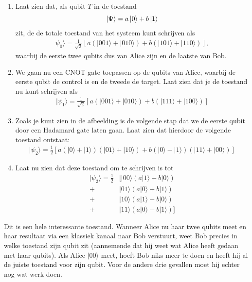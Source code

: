 \documentclass[../../main.tex]{subfiles}
\begin{document}
\clearpage
\begin{antwoord}
\end{antwoord}
\begin{opdracht}
\begin{enumerate}
\item Laat zien dat, als qubit $T$ in de toestand 
\[\ket{\Psi}=a\ket{0}+b\ket{1}\] 
zit, de de totale toestand van het systeem kunt schrijven als
\begin{align*}
\psi_0\rangle=\frac{1}{\sqrt{2}}\left[a (|001\rangle + |010\rangle) + b (|101\rangle +|110\rangle)\right],
\end{align*}
waarbij de eerste twee qubits dus van Alice zijn en de laatste van Bob.

\item We gaan nu een CNOT gate toepassen op de qubits van Alice, waarbij de eerste qubit de control is en de tweede de target. Laat zien dat je de toestand nu kunt schrijven als
\begin{align*}
|\psi_1\rangle=\frac{1}{\sqrt{2}}\left[a (|001\rangle + |010\rangle) + b (|111\rangle +|100\rangle)\right]
\end{align*}

\item Zoals je kunt zien in de afbeelding is de volgende stap dat we de eerste qubit door een Hadamard gate laten gaan. Laat zien dat hierdoor de volgende toestand ontstaat:
\begin{align*}
|\psi_2\rangle=\frac{1}{2}\left[a (|0\rangle +|1\rangle)(|01\rangle + |10\rangle) + b (|0\rangle - |1\rangle)(|11\rangle +|00\rangle)\right]
\end{align*}

\item Laat nu zien dat deze toestand om te schrijven is tot
\begin{align*}
|\psi_2\rangle=\frac{1}{2}&\big[ |00\rangle(a|1\rangle + b |0\rangle) \\
+& |01\rangle (a|0\rangle + b|1\rangle) \\
+&|10\rangle(a|1\rangle - b|0\rangle) \\
+ &|11\rangle (a|0\rangle - b|1\rangle) \big]
\end{align*}
\end{enumerate}
\end{opdracht}
Dit is een hele interessante toestand. Wanneer Alice nu haar twee qubits meet en haar resultaat via een klassiek kanaal naar Bob verstuurt, weet Bob precies in welke toestand zijn qubit zit (aannemende dat hij weet wat Alice heeft gedaan met haar qubits). Als Alice $|00\rangle$ meet, hoeft Bob niks meer te doen en heeft hij al de juiste toestand voor zijn qubit. Voor de andere drie gevallen moet hij echter nog wat werk doen.
\end{document}
